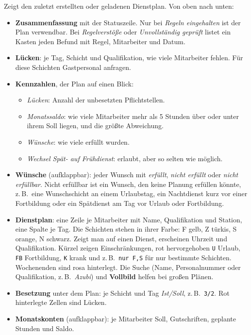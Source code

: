 \documentclass[11pt]{combiArticle}
\newcommand{\code}[1]{\texttt{#1}}
\newcommand{\knopf}[1]{\textbf{#1}}
\begin{document}
Zeigt den zuletzt erstellten oder geladenen Dienstplan. Von oben nach unten:
\begin{itemize}
  \item \textbf{Zusammenfassung} mit der Statuszeile. Nur bei \emph{Regeln eingehalten} ist der Plan
        verwendbar. Bei \emph{Regelverstöße} oder \emph{Unvollständig geprüft} listet ein Kasten jeden Befund
        mit Regel, Mitarbeiter und Datum.
  \item \textbf{Lücken}: je Tag, Schicht und Qualifikation, wie viele Mitarbeiter fehlen. Für diese Schichten
        Gastpersonal anfragen.
  \item \textbf{Kennzahlen}, der Plan auf einen Blick:
        \begin{itemize}
          \item \emph{Lücken}: Anzahl der unbesetzten Pflichtstellen.
          \item \emph{Monatssaldo}: wie viele Mitarbeiter mehr als 5 Stunden über oder unter ihrem Soll liegen,
                und die größte Abweichung.
          \item \emph{Wünsche}: wie viele erfüllt wurden.
          \item \emph{Wechsel Spät- auf Frühdienst}: erlaubt, aber so selten wie möglich.
        \end{itemize}
  \item \textbf{Wünsche} (aufklappbar): jeder Wunsch mit \emph{erfüllt}, \emph{nicht erfüllt} oder \emph{nicht
        erfüllbar}. Nicht erfüllbar ist ein Wunsch, den keine Planung erfüllen könnte, z.\,B.\ eine
        Wunschschicht an einem Urlaubstag, ein Nachtdienst kurz vor einer Fortbildung oder ein Spätdienst am Tag vor
        Urlaub oder Fortbildung.
  \item \textbf{Dienstplan}: eine Zeile je Mitarbeiter mit Name, Qualifikation und Station, eine Spalte je Tag.
        Die Schichten stehen in ihrer Farbe: F gelb, Z türkis, S orange, N schwarz. Zeigt man auf einen Dienst,
        erscheinen Uhrzeit und Qualifikation. Kürzel zeigen Einschränkungen, rot hervorgehoben \code{U} Urlaub,
        \code{FB} Fortbildung, \code{K} krank und z.\,B.\ \code{nur F,S} für nur bestimmte Schichten. Wochenenden sind rosa
        hinterlegt. Die Suche (Name, Personalnummer oder Qualifikation, z.\,B.\ \emph{Azubi}) und
        \knopf{Vollbild} helfen bei großen Plänen.
  \item \textbf{Besetzung} unter dem Plan: je Schicht und Tag \emph{Ist/Soll}, z.\,B.\ \code{3/2}.
        Rot hinterlegte Zellen sind Lücken.
  \item \textbf{Monatskonten} (aufklappbar): je Mitarbeiter Soll, Gutschriften, geplante Stunden und Saldo.
\end{itemize}
\end{document}
